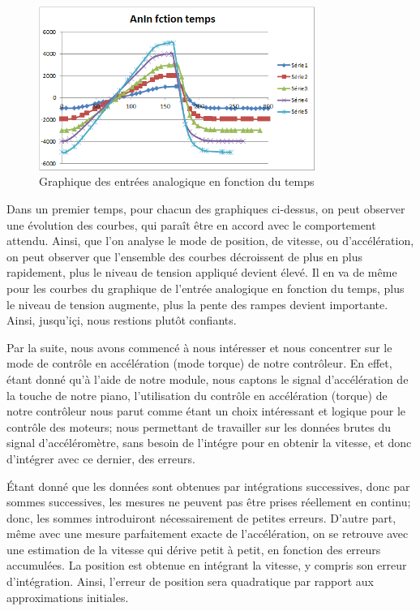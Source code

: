 \documentclass[french,a4paper,12pt]{report}
\begin{document}
{\begin{figure}[h]
\begin{minipage}[c]{.46\linewidth}
         \centering
         \includegraphics[width=9cm]{m1_AnIn.png}
         \caption{Graphique des entrées analogique en fonction du temps}
     \end{minipage}
 	\end{figure}} 
		
	Dans un premier temps, pour chacun des graphiques ci-dessus, on peut observer une évolution des courbes, qui paraît être en accord avec le comportement attendu. Ainsi, que l'on analyse le mode de position, de vitesse, ou d'accélération, on peut observer que l'ensemble des courbes décroissent de plus en plus rapidement, plus le niveau de tension appliqué devient élevé. Il en va de même pour les courbes du graphique de l'entrée analogique en fonction du temps, plus le niveau de tension augmente, plus la pente des rampes devient importante. Ainsi, jusqu'içi, nous restions plutôt confiants.
	
	Par la suite, nous avons commencé à nous intéresser et nous concentrer sur le mode de contrôle en accélération (mode torque) de notre contrôleur. En effet, étant donné qu'à l'aide de notre module, nous captons le signal d'accélération de la touche de notre piano, l'utilisation du contrôle en accélération (torque) de notre contrôleur nous parut comme étant un choix intéressant et logique pour le contrôle des moteurs; nous permettant de travailler sur les données brutes du signal d'accéléromètre, 	sans besoin de l'intégre pour en obtenir la vitesse, et donc d'intégrer avec ce dernier, des erreurs.
	
	Étant donné que les données sont obtenues par intégrations successives, donc par sommes successives, les mesures ne peuvent pas être prises réellement en continu; donc, les sommes introduiront nécessairement de petites erreurs. D'autre part, même avec une mesure parfaitement exacte de l'accélération, on se retrouve avec une estimation de la vitesse qui dérive petit à petit, en fonction des erreurs accumulées. La position est obtenue en intégrant la vitesse, y compris son erreur d'intégration. Ainsi, l'erreur de position sera quadratique par rapport aux approximations initiales. 
	
\end{document}
